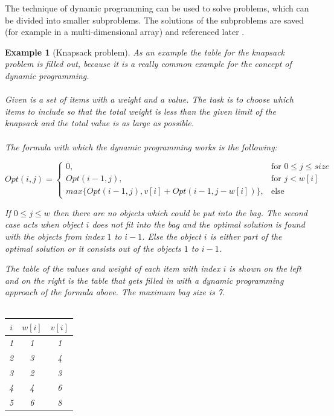 \documentclass[a4paper, 11pt]{article}
\newtheorem*{example*}{Example}
\begin{document}
The technique of dynamic programming can be used to solve problems, which can be divided into smaller subproblems. The solutions of the subproblems are saved (for example in a multi-dimensional array) and referenced later \cite{DP}. 
\begin{example*}[Knapsack problem]

As an example the table for the knapsack problem is filled out, because it is a really common example for the concept of dynamic programming.
\\ \\
Given is a set of items with a weight and a value. The task is to choose which items to include so that the total weight is less than the given limit of the knapsack and the total value is as large as possible.
\\ \\
The formula with which the dynamic programming works is the following:


  $$
Opt(i,j)=
\begin{cases}
0, & \text{for } 0\leq j \leq size\\
        Opt(i-1, j), & \text{for } j < w[i]\\
        max\{ Opt(i-1, j), v[i]+Opt(i-1, j-w[i]) \}, & \text{else } 
\end{cases}
$$

If $0 \leq j \leq w$ then there are no objects which could be put into the bag. The second case acts when object $i$ does not fit into the bag and the optimal solution is found with the objects from index $1$ to $i-1$. Else the object $i$ is either part of the optimal solution or it consists out of the objects $1$ to $i-1$.


The table of the values and weight of each item with index $i$ is shown on the left and on the right is the table that gets filled in with a dynamic programming approach of the formula above. The maximum bag size is 7.
\\ \\
\begin{minipage}{0.3\textwidth}

\begin{tabular}{|c|c|c|}
\hline
$i$ & $w[i]$ & $v[i]$ \\
\hline
1 & 1 & 1 \\
2 & 3 & 4 \\
3 & 2 & 3 \\
4 & 4 & 6 \\
5 & 6 & 8 \\
\hline
\end{tabular}



\end{minipage}
\end{example*}
\end{document}
